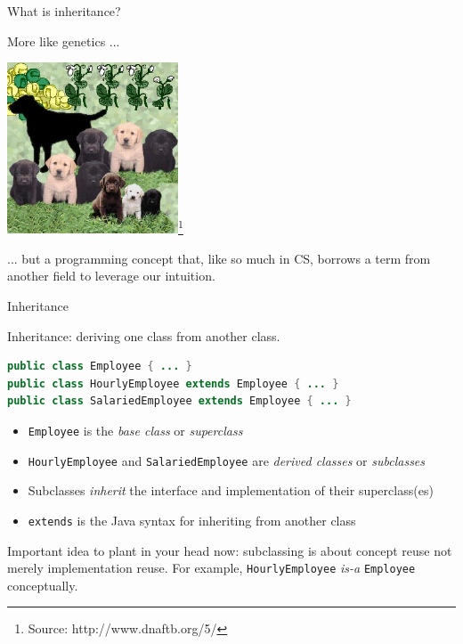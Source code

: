 \documentclass{beamer}
\begin{document}
\begin{frame}[fragile]{What is inheritance?}


More like genetics ...
\begin{center}
\includegraphics[height=2in]{puppy-inheritance.jpg}\footnote{Source: http://www.dnaftb.org/5/}\\
\end{center}
... but a programming concept that, like so much in CS, borrows a term from another field to leverage our intuition.

\end{frame}

\begin{frame}[fragile]{Inheritance}


Inheritance:  deriving one class from another class.
\begin{lstlisting}[language=Java]
public class Employee { ... }
public class HourlyEmployee extends Employee { ... }
public class SalariedEmployee extends Employee { ... }
\end{lstlisting}

\begin{itemize}
\item {\tt Employee} is the {\it base class} or {\it superclass}
\item {\tt HourlyEmployee} and {\tt SalariedEmployee} are {\it derived classes} or {\it subclasses}
\item Subclasses {\it inherit} the interface and implementation of their superclass(es)
\item {\tt extends} is the Java syntax for inheriting from another class
\end{itemize}

Important idea to plant in your head now: subclassing is about concept reuse not merely implementation reuse.  For example, {\tt HourlyEmployee} {\it is-a} {\tt Employee} conceptually.  

\end{frame}
\end{document}
